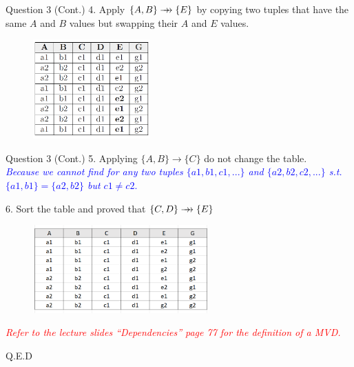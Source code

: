 \begin{frame}[fragile]{Question 3 (Cont.)}
4. Apply $\{A,B\} \mbox{$\; \rightarrow \! \! \! \! \rightarrow \; $} \{E\}$ by copying two tuples that have the same $A$ and $B$ values but swapping their $A$ and $E$ values.\\
\begin{figure}
	\includegraphics[width=0.4\textwidth, trim=0 0 0 0, clip]{4221-t5/images/3-4.png}
\end{figure}
\end{frame}


\begin{frame}[fragile]{Question 3 (Cont.)}
5. Applying $\{A,B\} \rightarrow \{C\}$ do not change the table.\\\vspace{5pt}
\textcolor{blue}{{\small \textit{Because we cannot find for any two tuples $\{a1,b1,c1,...\}$ and $\{a2,b2,c2,...\}$ s.t. $\{a1,b1\}=\{a2,b2\}$ but $c1 \ne c2$}.}}\\\vspace{5pt}

6. Sort the table and proved that $\{C,D\}\mbox{$\; \rightarrow \! \! \! \! \rightarrow \; $}\{E\}$ 
	\begin{figure}
		\includegraphics[width=0.6\textwidth, trim=0 0 0 0, clip]{4221-t5/images/3-6a.png}
	\end{figure}

\textcolor{red}{{\small \textit{Refer to the lecture slides ``Dependencies'' page 77 for the definition of a MVD.}}}\\\vspace{5pt}


	\hfill Q.E.D
\end{frame}


